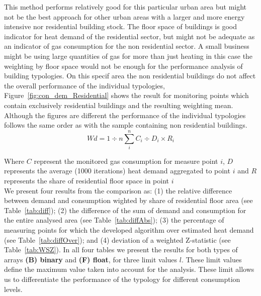 This method performs relatively good for this particular urban area but might
not be the best approach for other urban areas with a larger and more energy
intensive nor residential building stock. The floor space of buildings is good
indicator for heat demand of the residential sector, but might not be adequate
as an indicator of gas consumption for the non residential sector. A small
business might be using large quantities of gas for more than just heating in
this case the weighting by floor space would not be enough for the performance
analysis of building typologies. On this specif area the non residential
buildings do not affect the overall performance of the individual typologies,
Figure~\ref{fig:con_dem_Residential} shows the result for monitoring points
which contain exclusively residential buildings and the resulting weighting
mean. Although the figures are different the performance of the individual
typologies follows the same order as with the sample containing non residential
buildings.\\ 

\begin{equation} \label{eq:diff}
Wd = 1 \div n \sum_i^n C_i \div D_i \times R_i
\end{equation} 

Where
$C$ represent the  monitored gas consumption for measure point $i$, 
$D$ represents the average (1000 iterations) heat demand aggregated to point
$i$ and $R$ represents the share of residential floor space in point
$i$\\

We present four results from the comparison as: (1) the relative
difference between demand and consumption wighted by share of residential floor
area (see Table~\ref{tab:diff}); (2) the difference of the sum of demand and
consumption for the entire analysed area (see Table~\ref{tab:diffAbs}); (3) the
percentage of measuring points for which the developed algorithm over estimated
heat demand (see Table~\ref{tab:diffOver}); and (4) deviation of a weighted
Z-statistic (see Table~\ref{tab:WSZ}).  In all four tables we present the
results for both types of arrays \textbf{(B) binary} and \textbf{(F) float},
for three limit values $l$. These limit values define the maximum value taken
into account for the analysis. These limit allows us to differentiate the
performance of the typology for different consumption levels.\\

